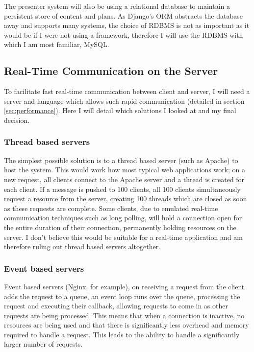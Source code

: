 \documentclass[a4papert,11pt,notitlepage]{ltxdoc}
\begin{document}
The presenter system will also be using a relational database to maintain a persistent store of content and plans. As Django's ORM abstracts the database away and supports many systems, the choice of RDBMS is not as important as it would be if I were not using a framework, therefore I will use the RDBMS with which I am most familiar, MySQL.

\subsection{Real-Time Communication on the Server}
To facilitate fast real-time communication between client and server, I will need a server and language which allows such rapid communication (detailed in section \ref{sec:performance}). Here I will detail which solutions I looked at and my final decision.

\subsubsection{Thread based servers}
The simplest possible solution is to a thread based server (such as Apache) to host the system. This would work how most typical web applications work; on a new request, all clients connect to the Apache server and a thread is created for each client. If a message is pushed to 100 clients, all 100 clients simultaneously request a resource from the server, creating 100 threads which are closed as soon as these requests are complete. Some clients, due to emulated real-time communication techniques such as long polling, will hold a connection open for the entire duration of their connection, permanently holding resources on the server. I don't believe this would be suitable for a real-time application and am therefore ruling out thread based servers altogether.

\subsubsection{Event based servers}
Event based servers (Nginx, for example), on receiving a request from the client adds the request to a queue, an event loop runs over the queue, processing the request and executing their callback, allowing requests to come in as other requests are being processed. This means that when a connection is inactive, no resources are being used and that there is significantly less overhead and memory required to handle a request. This leads to the ability to handle a significantly larger number of requests.
\end{document}
